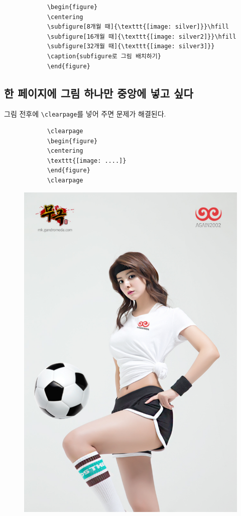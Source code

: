 				
			\begin{verbatim}
			\begin{figure}
			\centering
			\subfigure[8개월 때]{\texttt{[image: silver]}}\hfill
			\subfigure[16개월 때]{\texttt{[image: silver2]}}\hfill
			\subfigure[32개월 때]{\texttt{[image: silver3]}}
			\caption{subfigure로 그림 배치하기}
			\end{figure}
			\end{verbatim}
		
		
		
		\clearpage
		\subsection{한 페이지에 그림 하나만 중앙에 넣고 싶다}
		
			그림 전후에 \verb|\clearpage|를 넣어 주면 문제가 해결된다.
			\begin{verbatim}
			\clearpage
			\begin{figure}
			\centering
			\texttt{[image: ....]}
			\end{figure}
			\clearpage
			\end{verbatim}
		
		
			\clearpage
			\begin{figure}
			\centering
			\includegraphics[width=1\textwidth]{./fig/8.pdf}
			\end{figure}
			\clearpage
		
